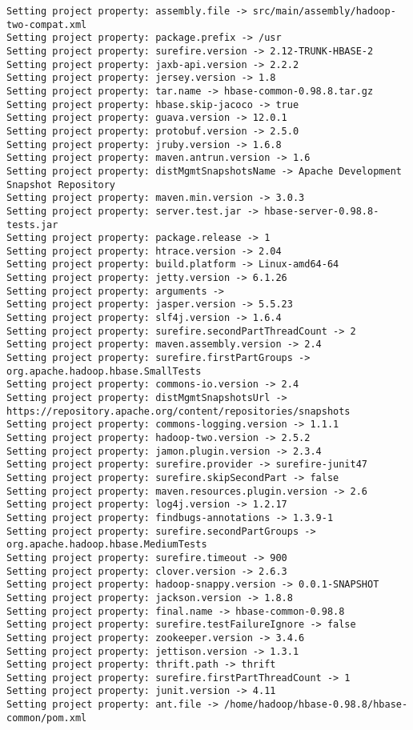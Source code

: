 \begin{verbatim}
Setting project property: assembly.file -> src/main/assembly/hadoop-two-compat.xml
Setting project property: package.prefix -> /usr
Setting project property: surefire.version -> 2.12-TRUNK-HBASE-2
Setting project property: jaxb-api.version -> 2.2.2
Setting project property: jersey.version -> 1.8
Setting project property: tar.name -> hbase-common-0.98.8.tar.gz
Setting project property: hbase.skip-jacoco -> true
Setting project property: guava.version -> 12.0.1
Setting project property: protobuf.version -> 2.5.0
Setting project property: jruby.version -> 1.6.8
Setting project property: maven.antrun.version -> 1.6
Setting project property: distMgmtSnapshotsName -> Apache Development Snapshot Repository
Setting project property: maven.min.version -> 3.0.3
Setting project property: server.test.jar -> hbase-server-0.98.8-tests.jar
Setting project property: package.release -> 1
Setting project property: htrace.version -> 2.04
Setting project property: build.platform -> Linux-amd64-64
Setting project property: jetty.version -> 6.1.26
Setting project property: arguments ->
Setting project property: jasper.version -> 5.5.23
Setting project property: slf4j.version -> 1.6.4
Setting project property: surefire.secondPartThreadCount -> 2
Setting project property: maven.assembly.version -> 2.4
Setting project property: surefire.firstPartGroups -> org.apache.hadoop.hbase.SmallTests
Setting project property: commons-io.version -> 2.4
Setting project property: distMgmtSnapshotsUrl -> https://repository.apache.org/content/repositories/snapshots
Setting project property: commons-logging.version -> 1.1.1
Setting project property: hadoop-two.version -> 2.5.2
Setting project property: jamon.plugin.version -> 2.3.4
Setting project property: surefire.provider -> surefire-junit47
Setting project property: surefire.skipSecondPart -> false
Setting project property: maven.resources.plugin.version -> 2.6
Setting project property: log4j.version -> 1.2.17
Setting project property: findbugs-annotations -> 1.3.9-1
Setting project property: surefire.secondPartGroups -> org.apache.hadoop.hbase.MediumTests
Setting project property: surefire.timeout -> 900
Setting project property: clover.version -> 2.6.3
Setting project property: hadoop-snappy.version -> 0.0.1-SNAPSHOT
Setting project property: jackson.version -> 1.8.8
Setting project property: final.name -> hbase-common-0.98.8
Setting project property: surefire.testFailureIgnore -> false
Setting project property: zookeeper.version -> 3.4.6
Setting project property: jettison.version -> 1.3.1
Setting project property: thrift.path -> thrift
Setting project property: surefire.firstPartThreadCount -> 1
Setting project property: junit.version -> 4.11
Setting project property: ant.file -> /home/hadoop/hbase-0.98.8/hbase-common/pom.xml

\end{verbatim}

